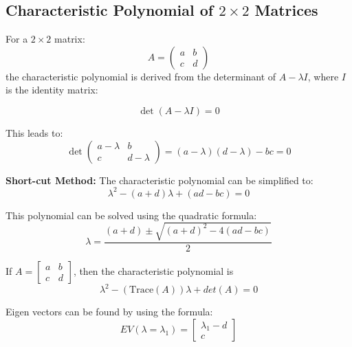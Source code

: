 \documentclass[
  letterpaper,
  DIV=11,
  numbers=noendperiod]{scrreprt}
\theoremstyle{plain}
\theoremstyle{definition}
\theoremstyle{remark}
\begin{document}
\subsection{\texorpdfstring{Characteristic Polynomial of \(2 \times 2\)
Matrices}{Characteristic Polynomial of 2 \textbackslash times 2 Matrices}}\label{characteristic-polynomial-of-2-times-2-matrices}

For a \(2 \times 2\) matrix: \[
A = \begin{pmatrix} a & b \\ c & d \end{pmatrix}
\] the characteristic polynomial is derived from the determinant of
\(A - \lambda I\), where \(I\) is the identity matrix:

\[
\det(A - \lambda I) = 0
\]

This leads to: \[
\det\begin{pmatrix} a - \lambda & b \\ c & d - \lambda \end{pmatrix} = (a - \lambda)(d - \lambda) - bc = 0
\]

\textbf{Short-cut Method:} The characteristic polynomial can be
simplified to: \[
\lambda^2 - (a + d)\lambda + (ad - bc) = 0
\]

This polynomial can be solved using the quadratic formula: \[
\lambda = \frac{(a + d) \pm \sqrt{(a + d)^2 - 4(ad - bc)}}{2}
\]

\begin{tcolorbox}[enhanced jigsaw, leftrule=.75mm, bottomtitle=1mm, colback=white, toptitle=1mm, opacitybacktitle=0.6, toprule=.15mm, colbacktitle=quarto-callout-important-color!10!white, arc=.35mm, colframe=quarto-callout-important-color-frame, title=\textcolor{quarto-callout-important-color}{\faExclamation}\hspace{0.5em}{Shortcut to write Characteristic polynomial of a \(2\times 2\) matrix}, titlerule=0mm, rightrule=.15mm, left=2mm, bottomrule=.15mm, breakable, coltitle=black, opacityback=0]

If \(A=\begin{bmatrix} a & b\\ c& d\end{bmatrix}\), then the
characteristic polynomial is
\[\lambda^2-(\text{Trace}(A))\lambda+det(A)=0\]

Eigen vectors can be found by using the formula: \begin{equation*}
EV(\lambda=\lambda_1)=\begin{bmatrix}\lambda_1-d\\ c\end{bmatrix}
\end{equation*}

\end{tcolorbox}
\end{document}
